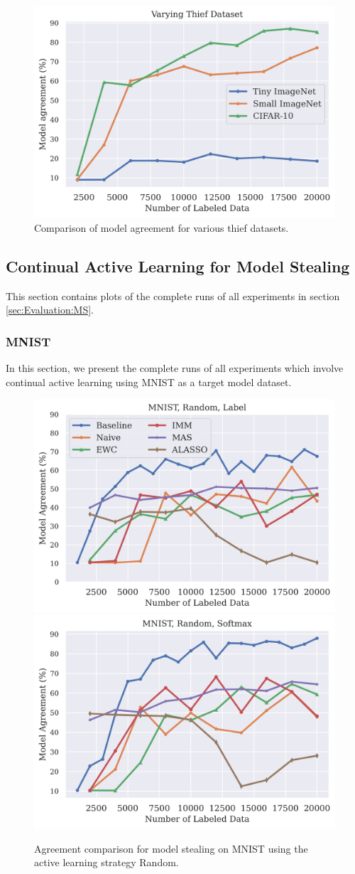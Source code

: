 \begin{figure}[h]
    \centering
    \includegraphics[width=0.8\linewidth]{images/results_CALMS/effect_dataset.png}
    \caption{Comparison of model agreement for various thief datasets.}
    \label{fig:Appendix:MS:ActiveThief:EffectDataset}
\end{figure}

\clearpage


\subsection{Continual Active Learning for Model Stealing}
\label{sec:Appendix:CALMS}
This section contains plots of the complete runs of all experiments in section \ref{sec:Evaluation:MS}.

\subsubsection{MNIST}
\label{sec:Appendix:CALMS:MNIST}
In this section, we present the complete runs of all experiments which involve continual active learning using MNIST as a target model dataset.

\begin{figure}[!htb]
    \centering
    \includegraphics[width=0.48\linewidth]{images/results_CALMS/mnist_label_random.png} \hfill
    \includegraphics[width=0.48\linewidth]{images/results_CALMS/mnist_softmax_random.png}
    \caption{Agreement comparison for model stealing on MNIST using the active learning strategy Random.}
    \label{fig:CALMSMNISTRandom}
\end{figure}

